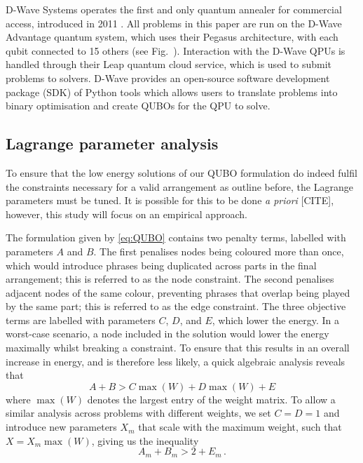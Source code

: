 \documentclass[12pt]{article}
\theoremstyle{definition}
\begin{document}
D-Wave Systems operates the first and only quantum annealer for commercial access, introduced in 2011 . All problems in this paper are run on the D-Wave Advantage quantum system, which uses their Pegasus architecture, with each qubit connected to 15 others (see Fig.\  ).
Interaction with the D-Wave QPUs is handled through their Leap quantum cloud service, which is used to submit problems to solvers. D-Wave provides an open-source software development package (SDK) of Python tools which allows users to translate problems into binary optimisation and create QUBOs for the QPU to solve.

\subsection{Lagrange parameter analysis}

To ensure that the low energy solutions of our QUBO formulation do indeed fulfil the constraints necessary for a valid arrangement as outline before, the Lagrange parameters must be tuned. It is possible for this to be done \textit{a priori} [CITE], however, this study will focus on an empirical approach.

The formulation given by \cref{eq:QUBO} contains two penalty terms, labelled with parameters $A$ and $B$. The first penalises nodes being coloured more than once, which would introduce phrases being duplicated across parts in the final arrangement; this is referred to as the node constraint. The second penalises adjacent nodes of the same colour, preventing phrases that overlap being played by the same part; this is referred to as the edge constraint. The three objective terms are labelled with parameters $C$, $D$, and $E$, which lower the energy. In a worst-case scenario, a node included in the solution would lower the energy maximally whilst breaking a constraint. To ensure that this results in an overall increase in energy, and is therefore less likely, a quick algebraic analysis reveals that
\begin{equation}
    A + B > C\max(W) + D\max(W) + E
\end{equation}
where $\max(W)$ denotes the largest entry of the weight matrix. To allow a similar analysis across problems with different weights, we set $C=D=1$ and introduce new parameters $X_m$ that scale with the maximum weight, such that $X = X_m\max(W)$, giving us the inequality
\begin{equation}
    A_m + B_m > 2 + E_m \,.
\end{equation}
\end{document}
